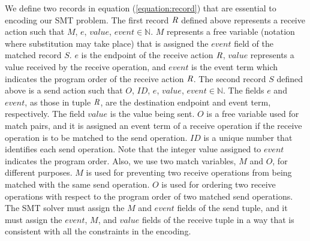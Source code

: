 We define two records in equation (\ref{equation:record}) that are essential to encoding our SMT problem. The first record $\emph{R}$ defined above represents a receive action such that $\mathit{M}$, $\mathit{e}$, $\mathit{value}$, $\mathit{event} \in \mathbb{N}$. $\mathit{M}$ represents a free variable (notation where substitution may take place) that is assigned the $\mathit{event}$ field of the matched record $S$. $\mathit{e}$ is the endpoint of the receive action $\emph{R}$, $\mathit{value}$ represents a value received by the receive operation, and $\mathit{event}$ is the event term which indicates the program order of the receive action $\emph{R}$. The second record $S$ defined above is a send action such that $\mathit{O}$, $\mathit{ID}$, $\mathit{e}$, $\mathit{value}$, $\mathit{event} \in \mathbb{N}$. The fields $\mathit{e}$ and $\mathit{event}$, as those in tuple $\emph{R}$, are the destination endpoint and event term, respectively. The field $\mathit{value}$ is the value being sent. $\mathit{O}$ is a free variable used for match pairs, and it is assigned an event term of a receive operation if the receive operation is to be matched to the send operation. $\mathit{ID}$ is a unique number that identifies each send operation. Note that the integer value assigned to $\mathit{event}$ indicates the program order. Also, we use two match variables, $M$ and $\mathit{O}$, for different purposes. $M$ is used for preventing two receive operations from being matched with the same send operation. $\mathit{O}$ is used for ordering two receive operations with respect to the program order of two matched send operations. The SMT solver must assign the $\mathit{M}$ and $\mathit{event}$ fields of the send tuple, and it must assign the $\mathit{event}$, $\mathit{M}$, and $\mathit{value}$ fields of the receive tuple in a way that is consistent with all the constraints in the encoding.


